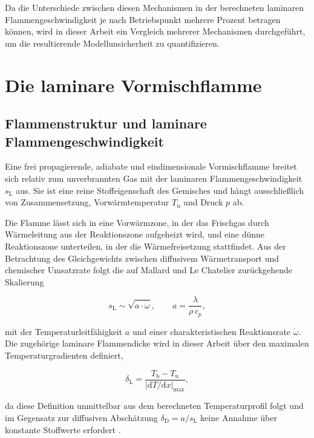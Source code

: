 Da die Unterschiede zwischen diesen Mechanismen in der berechneten laminaren
Flammengeschwindigkeit je nach Betriebspunkt mehrere Prozent betragen können,
wird in dieser Arbeit ein Vergleich mehrerer Mechanismen durchgeführt, um die
resultierende Modellunsicherheit zu quantifizieren.

\section{Die laminare Vormischflamme}\label{sec:laminar}

\subsection{Flammenstruktur und laminare Flammengeschwindigkeit}\label{subsec:sl}

Eine frei propagierende, adiabate und eindimensionale Vormischflamme breitet
sich relativ zum unverbrannten Gas mit der laminaren Flammengeschwindigkeit
$s_\mathrm{L}$ aus. Sie ist eine reine Stoffeigenschaft des Gemisches und hängt
ausschließlich von Zusammensetzung, Vorwärmtemperatur $T_\mathrm{u}$ und Druck
$p$ ab.

Die Flamme lässt sich in eine Vorwärmzone, in der das Frischgas durch
Wärmeleitung aus der Reaktionszone aufgeheizt wird, und eine dünne
Reaktionszone unterteilen, in der die Wärmefreisetzung stattfindet. Aus der
Betrachtung des Gleichgewichts zwischen diffusivem Wärmetransport und
chemischer Umsatzrate folgt die auf Mallard und Le Chatelier zurückgehende
Skalierung

\begin{equation}
	\label{eq:mallard}
	s_\mathrm{L} \sim \sqrt{a \cdot \dot{\omega}},
	\qquad
	a = \frac{\lambda}{\rho\,c_p},
\end{equation}

mit der Temperaturleitfähigkeit $a$ und einer charakteristischen
Reaktionsrate $\dot{\omega}$. Die zugehörige laminare Flammendicke wird in
dieser Arbeit über den maximalen Temperaturgradienten definiert,

\begin{equation}
	\label{eq:flammendicke}
	\delta_\mathrm{L} = \frac{T_\mathrm{b} - T_\mathrm{u}}
	{\left|\mathrm{d}T/\mathrm{d}x\right|_\mathrm{max}},
\end{equation}

da diese Definition unmittelbar aus dem berechneten Temperaturprofil folgt und
im Gegensatz zur diffusiven Abschätzung $\delta_\mathrm{D} = a/s_\mathrm{L}$
keine Annahme über konstante Stoffwerte erfordert \cite{Poinsot_2011}.

